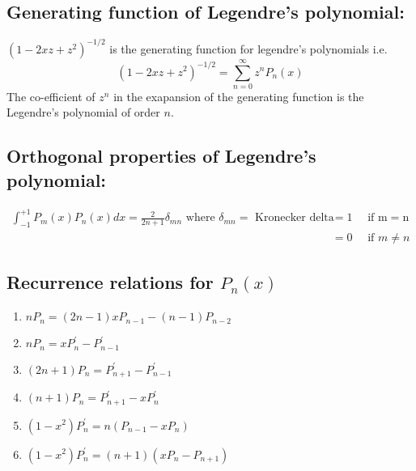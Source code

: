 \subsection{Generating function of Legendre's polynomial:}
$\left(1-2 x z+z^{2}\right)^{-1 / 2}$ is the generating function for legendre's polynomials i.e. $$\left(1-2 x z+z^{2}\right)^{-1 / 2}=\sum_{n=0}^{\infty} z^{n} P_{n}(x)$$
The co-efficient of $z^{n}$ in the exapansion of the generating function is the Legendre's polynomial of order $n$.
\subsection{Orthogonal properties of Legendre's polynomial:}
\begin{align*}
\int_{-1}^{+1} P_{m}(x) P_{n}(x) d x=\frac{2}{2 n+1} \delta_{m n} \text { where } \delta_{m n}=\text { Kronecker delta }&=1 \quad \text { if } \mathrm{m}=\mathrm{n}\\
&=0 \quad \text { if } m \neq n
\end{align*}
\subsection{Recurrence relations for $P_{n}(x)$ }
\begin{enumerate}
	\item $n P_{n}=(2 n-1) x P_{n-1}-(n-1) P_{n-2}$
	\item $n P_{n}=x P_{n}^{\prime}-P_{n-1}^{\prime}$
	\item $(2 n+1) P_{n}=P_{n+1}^{\prime}-P_{n-1}^{\prime}$
	\item $(n+1) P_{n}=P_{n+1}^{\prime}-x P_{n}^{\prime}$
	\item $\left(1-x^{2}\right) P_{n}^{\prime}=n\left(P_{n-1}-x P_{n}\right)$
	\item $\left(1-x^{2}\right) P_{n}^{\prime}=(n+1)\left(x P_{n}-P_{n+1}\right)$
\end{enumerate}

